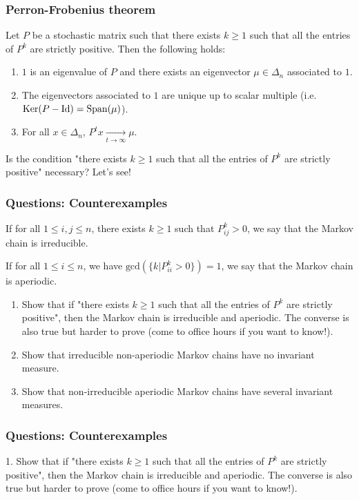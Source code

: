 \documentclass{beamer}
\begin{document}
\begin{frame}[t]
\frametitle{Perron-Frobenius theorem}
\begin{theorem}\label{th:perron_frobenius}
	Let $P$ be a stochastic matrix such that there exists $k \geq 1$ such that all the entries of $P^k$ are strictly positive. Then the following holds:
	\begin{enumerate}
		\item $1$ is an eigenvalue of $P$ and there exists an eigenvector $\mu \in \Delta_n$ associated to $1$.
		\item The eigenvectors associated to $1$ are unique up to scalar multiple (i.e.\ ${{\rm Ker}}(P-{{\rm Id}}) = {{\rm Span}}(\mu)$).
		\item For all $x \in \Delta_n$, $P^t x \xrightarrow[t \to \infty]{} \mu$.
	\end{enumerate}
\end{theorem}
Is the condition "there exists $k \geq 1$ such that all the entries of $P^k$ are strictly positive" necessary? Let's see!
\end{frame}

\begin{frame}[t]
\frametitle{Questions: Counterexamples}
\begin{definition}
If for all $1 \leq i,j \leq n$, there exists $k \geq 1$ such that $P^{k}_{ij} > 0$, we say that the Markov chain is irreducible.
\end{definition}
\begin{definition}
If for all $1 \leq i \leq n$, we have $\text{gcd}(\{k | P_{ii}^{k} > 0\}) = 1$, we say that the Markov chain is aperiodic.
\end{definition}
\begin{enumerate}
\item Show that if "there exists $k \geq 1$ such that all the entries of $P^k$ are strictly positive", then the Markov chain is irreducible and aperiodic. The converse is also true but harder to prove (come to office hours if you want to know!).
\item Show that irreducible non-aperiodic Markov chains have no invariant measure.
\item Show that non-irreducible aperiodic Markov chains have several invariant measures.
\end{enumerate}
\end{frame}

\begin{frame}[t]
\frametitle{Questions: Counterexamples}
1. Show that if "there exists $k \geq 1$ such that all the entries of $P^k$ are strictly positive", then the Markov chain is irreducible and aperiodic. The converse is also true but harder to prove (come to office hours if you want to know!).
\pause
\end{frame}
\end{document}
